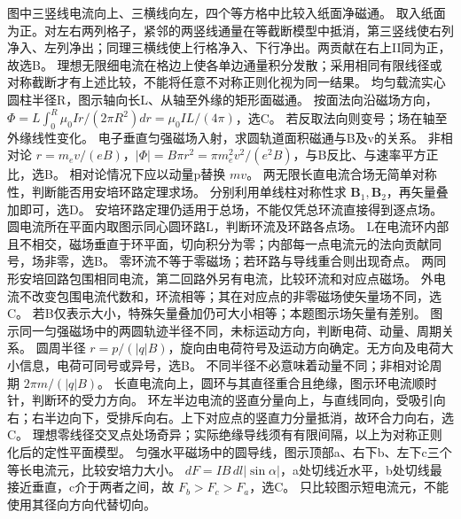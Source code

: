 \problemtext 图中三竖线电流向上、三横线向左，四个等方格中比较入纸面净磁通。
\workings 取入纸面为正。对左右两列格子，紧邻的两竖线通量在等截断模型中抵消，第三竖线使右列净入、左列净出；同理三横线使上行格净入、下行净出。两贡献在右上II同为正，故选B。
\crosscheck 理想无限细电流在格边上使各单边通量积分发散；采用相同有限线径或对称截断才有上述比较，不能将任意不对称正则化视为同一结果。
\problemtext 均匀载流实心圆柱半径R，图示轴向长L、从轴至外缘的矩形面磁通。
\workings 按面法向沿磁场方向，$\Phi=L\int_0^R\mu_0Ir/(2\pi R^2)dr=\mu_0IL/(4\pi)$，选C。
\crosscheck 若反取法向则变号；场在轴至外缘线性变化。
\problemtext 电子垂直匀强磁场入射，求圆轨道面积磁通与B及v的关系。
\workings 非相对论 $r=m_ev/(eB)$，$|\Phi|=B\pi r^2=\pi m_e^2v^2/(e^2B)$，与B反比、与速率平方正比，选B。
\crosscheck 相对论情况下应以动量p替换 $mv$。
\problemtext 两无限长直电流合场无简单对称性，判断能否用安培环路定理求场。
\workings 分别利用单线柱对称性求 $\bm B_1,\bm B_2$，再矢量叠加即可，选D。
\crosscheck 安培环路定理仍适用于总场，不能仅凭总环流直接得到逐点场。
\problemtext 圆电流所在平面内取图示同心圆环路L，判断环流及环路各点场。
\workings L在电流环内部且不相交，磁场垂直于环平面，切向积分为零；内部每一点电流元的法向贡献同号，场非零，选B。
\crosscheck 零环流不等于零磁场；若环路与导线重合则出现奇点。
\problemtext 两同形安培回路包围相同电流，第二回路外另有电流，比较环流和对应点磁场。
\workings 外电流不改变包围电流代数和，环流相等；其在对应点的非零磁场使矢量场不同，选C。
\crosscheck 若B仅表示大小，特殊矢量叠加仍可大小相等；本题图示场矢量有差别。
\problemtext 图示同一匀强磁场中的两圆轨迹半径不同，未标运动方向，判断电荷、动量、周期关系。
\workings 圆周半径 $r=p/(|q|B)$，旋向由电荷符号及运动方向确定。无方向及电荷大小信息，电荷可同号或异号，选B。
\crosscheck 不同半径不必意味着动量不同；非相对论周期 $2\pi m/(|q|B)$。
\problemtext 长直电流向上，圆环与其直径重合且绝缘，图示环电流顺时针，判断环的受力方向。
\workings 环左半边电流的竖直分量向上，与直线同向，受吸引向右；右半边向下，受排斥向右。上下对应点的竖直力分量抵消，故环合力向右，选C。
\crosscheck 理想零线径交叉点处场奇异；实际绝缘导线须有有限间隔，以上为对称正则化后的定性平面模型。
\problemtext 匀强水平磁场中的圆导线，图示顶部a、右下b、左下c三个等长电流元，比较安培力大小。
\workings $dF=IB\,dl|\sin\alpha|$，a处切线近水平，b处切线最接近垂直，c介于两者之间，故 $F_b>F_c>F_a$，选C。
\crosscheck 只比较图示短电流元，不能使用其径向方向代替切向。
